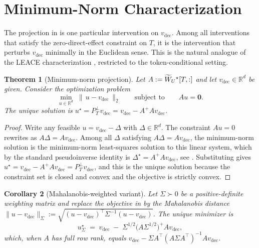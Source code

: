 \documentclass[11pt,letterpaper]{article}
\theoremstyle{plain}
\newtheorem{theorem}{Theorem}[section]
\newtheorem{corollary}[theorem]{Corollary}
\theoremstyle{definition}
\newcommand{\R}{\mathbb{R}}
\newcommand{\1}{\mathbf{1}}
\newcommand{\zero}{\mathbf{0}}
\newcommand{\WUt}{\widetilde{W}_{U}\mathchoice{}{}{}{}}
\newcommand{\vdec}{v_{\text{dec}}}
\newcommand{\PTperp}{P_{T}^{\perp}}
\begin{document}
\section{Minimum-Norm Characterization}\label{sec:minnorm}

The projection in  is one particular intervention on $\vdec$. Among all interventions that satisfy the zero-direct-effect constraint on $T$, it is the intervention that perturbs $\vdec$ minimally in the Euclidean sense. This is the natural analogue of the LEACE characterization \cite{belrose2023leace}, restricted to the token-conditional setting.

\begin{theorem}[Minimum-norm projection]\label{thm:minnorm}
Let $A := \WUt^\star[T,:]$ and let $\vdec \in \R^d$ be given. Consider the optimization problem
\begin{equation}
\min_{u \in \R^d} \;\|\,u - \vdec\,\|_2 \qquad \text{subject to}\qquad A u = \zero.
\label{eq:minnormproblem}
\end{equation}
The unique solution is $u^\star = \PTperp \vdec = \vdec - A^+ A \vdec$.
\end{theorem}

\begin{proof}
Write any feasible $u = \vdec - \Delta$ with $\Delta \in \R^d$. The constraint $A u = 0$ rewrites as $A \Delta = A \vdec$. Among all $\Delta$ satisfying $A \Delta = A \vdec$, the minimum-norm solution is the minimum-norm least-squares solution to this linear system, which by the standard pseudoinverse identity is $\Delta^\star = A^+ A \vdec$, see \cite[Sec.\ 5.5]{horn2012matrix}. Substituting gives $u^\star = \vdec - A^+ A \vdec = \PTperp \vdec$, and this is the unique solution because the constraint set is closed and convex and the objective is strictly convex.
\end{proof}

\begin{corollary}[Mahalanobis-weighted variant]\label{cor:mahalanobis}
Let $\Sigma \succ 0$ be a positive-definite weighting matrix and replace the objective in  by the Mahalanobis distance $\|u - \vdec\|_\Sigma := \sqrt{(u - \vdec)^\top \Sigma^{-1} (u - \vdec)}$. The unique minimizer is
\begin{equation}
u^\star_\Sigma \;=\; \vdec \;-\; \Sigma^{1/2} \big(A \Sigma^{1/2}\big)^+ A \vdec,
\label{eq:mahasoln}
\end{equation}
which, when $A$ has full row rank, equals $\vdec - \Sigma A^\top (A \Sigma A^\top)^{-1} A \vdec$.
\end{corollary}
\end{document}
